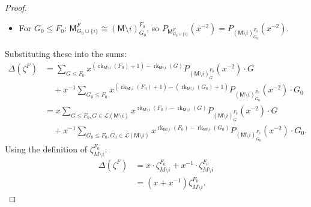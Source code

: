 \documentclass[11pt, a4paper, english]{amsart}
\theoremstyle{teoremas}
\theoremstyle{definition}
\DeclareMathOperator{\rk}{rk}
\newcommand{\M}{\mathsf{M}}
\newcommand{\cL}{\mathcal{L}}
\begin{document}
\begin{proof}
\begin{itemize}
        \item For $G_0 \leq F_0$: $\M_{G_0 \cup \{i\}}^{F} \cong (\M\setminus i)_{G_0}^{F_0}$, so $P_{\M_{G_0 \cup \{i\}}^{F}}(x^{-2}) = P_{(\M\setminus i)_{G_0}^{F_0}}(x^{-2})$.
    \end{itemize}
    Substituting these into the sums:
    \begin{align*}
        \Delta(\zeta^F) & = \sum_{G \leq F_0} x^{(\rk_{\M\setminus i}(F_0) + 1) - \rk_{\M\setminus i}(G)} P_{(\M\setminus i)_G^{F_0}}(x^{-2}) \cdot G                                               \\
                        & \quad + x^{-1} \sum_{G_0 \leq F_0} x^{(\rk_{\M\setminus i}(F_0) + 1) - (\rk_{\M\setminus i}(G_0) + 1)} P_{(\M\setminus i)_{G_0}^{F_0}}(x^{-2}) \cdot G_0                  \\
                        & = x \sum_{G \leq F_0, G \in \cL(\M\setminus i)} x^{\rk_{\M\setminus i}(F_0) - \rk_{\M\setminus i}(G)} P_{(\M\setminus i)_G^{F_0}}(x^{-2}) \cdot G                         \\
                        & \quad + x^{-1} \sum_{G_0 \leq F_0, G_0 \in \cL(\M\setminus i)} x^{\rk_{\M\setminus i}(F_0) - \rk_{\M\setminus i}(G_0)} P_{(\M\setminus i)_{G_0}^{F_0}}(x^{-2}) \cdot G_0.
    \end{align*}
    Using the definition of $\zeta^{F_0}_{M\setminus i}$:
    \begin{align*}
        \Delta(\zeta^F) & = x \cdot \zeta^{F_0}_{M\setminus i} + x^{-1} \cdot \zeta^{F_0}_{M\setminus i} \\
                        & = (x + x^{-1})\zeta^{F_0}_{M\setminus i}.
    \end{align*}
\end{proof}
\end{document}
